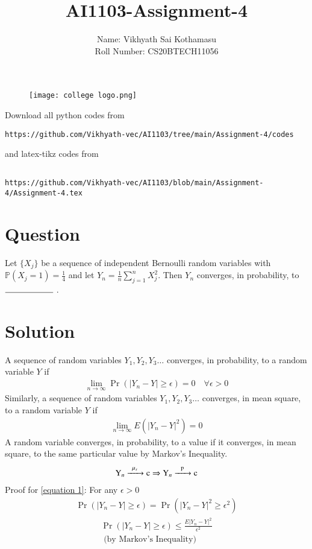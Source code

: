 \documentclass[journal,12pt,twocolumn]{IEEEtran}
\begin{document}
\title{AI1103-Assignment-4}
\author{Name: Vikhyath Sai Kothamasu\\Roll Number: CS20BTECH11056}
\maketitle
\newpage
\bigskip
\renewcommand{\thefigure}{\theenumi}
\renewcommand{\thetable}{\theenumi}

\begin{figure} [h]
    \texttt{[image: college logo.png]}
\end{figure}

Download all python codes from 
\begin{lstlisting}
https://github.com/Vikhyath-vec/AI1103/tree/main/Assignment-4/codes
\end{lstlisting}
%
and latex-tikz codes from 
%
\begin{lstlisting}

https://github.com/Vikhyath-vec/AI1103/blob/main/Assignment-4/Assignment-4.tex
\end{lstlisting}
\section*{Question}
Let $\{X_j\}$ be a sequence of independent Bernoulli random variables with $\mathbb{P}(X_j=1) = \frac{1}{4}$ and let $Y_n = \frac{1}{n} \sum_{j=1}^{n}X_j^2$. Then $Y_n$ converges, in probability, to $\rule{2cm}{0.15mm}$ .

\section*{Solution}
A sequence of random variables $Y_1,Y_2,Y_3\hdots$ converges, in probability, to a random variable $Y$ if
\begin{align}
    \lim_{n\rightarrow \infty}\Pr{(|Y_n-Y|\geq \epsilon)} = 0 \quad \forall \epsilon >0
\end{align}
Similarly, a sequence of random variables $Y_1,Y_2,Y_3\hdots$ converges, in mean square, to a random variable $Y$ if
\begin{align}
    \lim_{n\rightarrow \infty} E(|Y_n-Y|^2) = 0 
\end{align}
A random variable converges, in probability, to a value if it converges, in mean square, to the same particular value by Markov's Inequality.
\begin{align}
    \ce{Y_n ->[\mu_s] c} \Rightarrow \ce{Y_n ->[p] c} \label{equation 1}
\end{align}
Proof for \eqref{equation 1}: For any $\epsilon > 0$
\begin{align}
    \Pr{(|Y_n-Y|\geq \epsilon)} = \Pr{(|Y_n-Y|^2\geq \epsilon^2)}
\end{align}
\begin{multline}
    \Pr{(|Y_n-Y|\geq \epsilon)}  \leq \frac{E|Y_n-Y|^2}{\epsilon^2} 
    \\\text{ (by Markov's Inequality)}
\end{multline}
 
\end{document}
